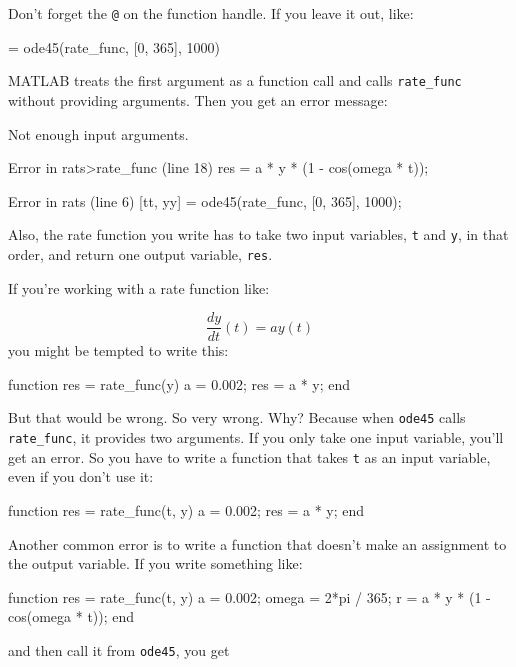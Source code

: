 Don't forget the \lstinline{@} on the function handle.
If you leave it out, like:

\begin{code}
[tt, yy] = ode45(rate_func, [0, 365], 1000)
\end{code}
MATLAB treats the first argument as a function
call and calls \lstinline{rate_func} without providing arguments.
Then you get an error message:


\begin{code}
Not enough input arguments.

Error in rats>rate_func (line 18)
    res = a * y * (1 - cos(omega * t));

Error in rats (line 6)
    [tt, yy] = ode45(rate_func, [0, 365], 1000);
\end{code}

Also, the rate function you write has to take two input variables,
\lstinline{t} and \lstinline{y}, in that order, and return one output variable,
\lstinline{res}.


If you're working with a rate function like:

\begin{equation*}
\frac{dy}{dt}(t) = a y(t)
\end{equation*}
you might be tempted to write this:

\begin{code}
function res = rate_func(y)        %
    a = 0.002;
    res = a * y;
end
\end{code}

But that would be wrong.  So very wrong.  Why?  Because
when \lstinline{ode45} calls \lstinline{rate_func}, it provides two arguments.
If you only take one input variable, you'll get an error.  So
you have to write a function that takes \lstinline{t} as an input
variable, even if you don't use it:


\begin{code}
function res = rate_func(t, y)     %
    a = 0.002;
    res = a * y;
end
\end{code}

Another common error is to write a function that doesn't make
an assignment to the output variable.  If you write something
like:

\begin{code}
function res = rate_func(t, y)
    a = 0.002;
    omega = 2*pi / 365;
    r = a * y * (1 - cos(omega * t));    %
end
\end{code}
 and then call it from \lstinline{ode45}, you get

